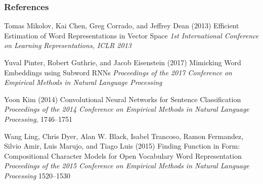 \begin{frame}
    \frametitle{References}
    \fontsize{8}{4}\selectfont
    \begin{thebibliography}{99} %
         Tomas Mikolov, Kai Chen, Greg Corrado, and Jeffrey Dean (2013)
        \newblock Efficient Estimation of Word Representations in Vector Space
        \newblock \emph{1st International Conference on Learning Representations, {ICLR} 2013}
        
         Yuval Pinter, Robert Guthrie,
         and Jacob Eisenstein (2017)
        \newblock Mimicking Word Embeddings using Subword RNNs
        \newblock \emph{Proceedings of the 2017 Conference on Empirical Methods in Natural Language Processing} 

         Yoon Kim (2014)
        \newblock Convolutional Neural Networks for Sentence Classification
        \newblock \emph{Proceedings of the 2014 Conference on Empirical Methods in Natural Language Processing}, 1746--1751
    
         Wang Ling, Chris Dyer, Alan W.
        Black, Isabel Trancoso, Ramon Fermandez, Silvio Amir, Luis
        Marujo, and Tiago Luis (2015)
        \newblock Finding Function in Form: Compositional Character Models for Open Vocabulary Word Representation
        \newblock \emph{Proceedings of the 2015 Conference on Empirical Methods in Natural Language Processing} 1520--1530
    \end{thebibliography}
    
\end{frame}